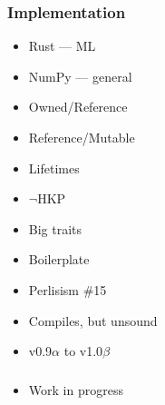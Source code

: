 \documentclass[xetex,mathserif,serif]{beamer}
\begin{document}
\begin{frame}
  \frametitle{Implementation}
  
  \begin{multicols}{2}
  \begin{itemize}
    \item Rust --- ML
    \item NumPy --- general
    \item Owned/Reference
    \item Reference/Mutable
    \item Lifetimes
    \item $\neg$HKP
    \columnbreak

    \item Big traits
    \item Boilerplate
    \item Perlisism \#15
    \item Compiles, but unsound
    \item v0.9$\alpha$ to v1.0$\beta$
  \end{itemize}
  \end{multicols}
\end{frame}

\begin{frame}
  \frametitle{}
  \begin{itemize}
    \item Work in progress
  \end{itemize}
\end{frame}
\end{document}
